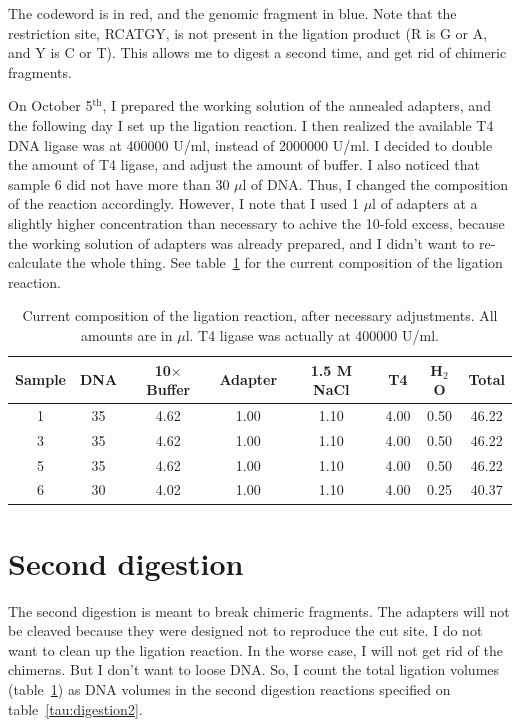 \documentclass[a4paper,12pt]{article}
\begin{document}
The codeword is in red, and the genomic fragment in blue. Note that the restriction site, RCATGY, is not present in the ligation product (R is G or A, and Y is C or T). This allows me to digest a second time, and get rid of chimeric fragments.

On October 5$^\mathrm{th}$, I prepared the working solution of the annealed adapters, and the following day I set up the ligation reaction. I then realized the available T4 DNA ligase was at 400000 U/ml, instead of 2000000 U/ml. I decided to double the amount of T4 ligase, and adjust the amount of buffer. I also noticed that sample 6 did not have more than 30 $\mu$l of DNA. Thus, I changed the composition of the reaction accordingly. However, I note that I used 1 $\mu$l of adapters at a slightly higher concentration than necessary to achive the 10-fold excess, because the working solution of adapters was already prepared, and I didn't want to re-calculate the whole thing. See table~\ref{tau:ligation2} for the current composition of the ligation reaction.

\begin{table}
\caption{Current composition of the ligation reaction, after necessary adjustments. All amounts are in $\mu$l. T4 ligase was actually at 400000 U/ml.}\label{tau:ligation2}
\vspace*{0.2cm}
\begin{tabular}{cccccccc}
\toprule
Sample&DNA&10$\times$ Buffer&Adapter&1.5 M NaCl&T4&H$_2$O&Total\\
\midrule
1&35&4.62&1.00&1.10&4.00&0.50&46.22\\
3&35&4.62&1.00&1.10&4.00&0.50&46.22\\
5&35&4.62&1.00&1.10&4.00&0.50&46.22\\
6&30&4.02&1.00&1.10&4.00&0.25&40.37\\
\bottomrule
\end{tabular}
\end{table}

\section{Second digestion}
The second digestion is meant to break chimeric fragments. The adapters will not be cleaved because they were designed not to reproduce the cut site. I do not want to clean up the ligation reaction. In the worse case, I will not get rid of the chimeras. But I don't want to loose DNA. So, I count the total ligation volumes (table~\ref{tau:ligation2}) as DNA volumes in the second digestion reactions specified on table~\ref{tau:digestion2}.
\end{document}
